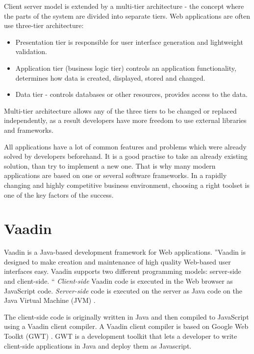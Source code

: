    	Client server model is extended by a multi-tier architecture - the
    	concept where the parts of the system are divided into separate tiers. Web applications
    	 are often use three-tier architecture:
    	 \begin{itemize}
    	   \item Presentation tier is responsible for user interface generation and
    	   lightweight validation.
    	   \item Application tier (business logic tier) controls an application
    	   functionality, determines how data is created, displayed, stored and
    	   changed.
    	   \item Data tier - controls databases or other resources, provides access
    	   to the data.
    	 \end{itemize}
    	Multi-tier architecture allows any of the three tiers to be changed or
    	replaced independently, as a result developers have more freedom to use
    	external libraries and frameworks.
		
		All	applications have a lot of common features and problems which were already
		solved by developers beforehand. It is a good practise to take an already
		existing solution, than try to implement a new one. That is why many
		modern applications are based on one or several software frameworks. In a
		rapidly changing and highly competitive business environment, choosing a right toolset is one of
		the key factors of the success.	 	
		
  \section{Vaadin}
  \label{ch:vaadin}
    Vaadin is a Java-based development framework for Web applications. ''Vaadin
    is designed to make creation and maintenance of high quality Web-based user interfaces easy.
   Vaadin supports two different programming models: server-side and client-side. 
   `` \cite[pr1.1]{bookVaaidn}
   \emph{Client-side} Vaadin code is executed in the Web browser as JavaScript
   code.
   \emph{Server-side} code is executed on the server as Java code on the Java
   Virtual Machine (JVM) \cite{jvmArticle}.

   The client-side code is originally written in Java and then
   compiled to JavaScript using a Vaadin client compiler. A Vaadin client
   compiler is based on Google Web Toolkt (GWT) \cite{gwtWebSite}. GWT is a
   development toolkit that lets a developer to write client-side applications in Java and deploy
   them as Javascript.
   

